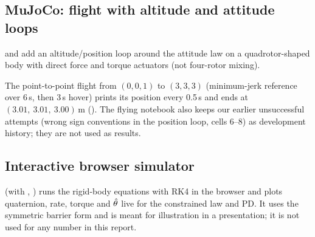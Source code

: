 \subsection{MuJoCo: flight with altitude and attitude loops}

 and  add an altitude/position loop around the
attitude law on a quadrotor-shaped body with direct force and torque actuators (not four-rotor mixing).


The point-to-point flight from $(0,0,1)$ to $(3,3,3)$ (minimum-jerk reference over 6\,s, then 3\,s hover) prints its
position every 0.5\,s and ends at $(3.01,\ 3.01,\ 3.00)$\,m (). The flying notebook also
keeps our earlier unsuccessful attempts (wrong sign conventions in the position loop, cells 6--8) as development history;
they are not used as results.

\subsection{Interactive browser simulator}

 (with , ) runs the rigid-body equations with RK4 in the browser and plots
quaternion, rate, torque and $\hat{\theta}$ live for the constrained law and PD. It uses the symmetric barrier form and is meant
for illustration in a presentation; it is not used for any number in this report.

